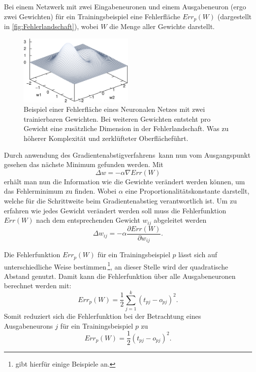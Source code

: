 Bei einem Netzwerk mit zwei Eingabeneuronen und einem Ausgabeneuron (ergo zwei Gewichten) für ein Trainingsbeispiel eine Fehlerfläche $Err_p(W)$ (dargestellt in \autoref{fig:Fehlerlandschaft}), wobei $W$ die Menge aller Gewichte darstellt.

\begin{figure}[tb]
    \centering
        \includegraphics[width=0.5\textwidth]{Bilder/misc/Fehlerlandschaft.png}
    \caption{Beispiel einer Fehlerfläche eines Neuronalen Netzes mit zwei trainierbaren Gewichten. Bei weiteren Gewichten entsteht pro Gewicht eine zusätzliche Dimension in der Fehlerlandschaft. Was zu höherer Komplexität und zerklüfteter \glqq Oberfläche\grqq führt.\protect\footnotemark{}}
    \label{fig:Fehlerlandschaft}
\end{figure}
\addtocounter{footnote}{-1}     %
\addtocounter{Hfootnote}{-1}    %
\wrapfigfoot{}

Durch anwendung des Gradientenabstigverfahrens\, kann nun vom Ausgangspunkt gesehen das nächste Minimum gefunden werden. Mit
\begin{equation}
\Delta w = - \alpha \nabla Err(W)
\end{equation}
erhält man nun die Information wie die Gewichte verändert werden können, um das Fehlerminimum zu finden.
Wobei $\alpha$ eine Proportionalitätskonstante darstellt, welche für die Schrittweite beim Gradientenabstieg verantwortlich ist.
Um zu erfahren wie jedes Gewicht verändert werden soll muss die Fehlerfunktion $Err(W)$ nach dem entsprechenden Gewicht $w_{ij}$ abgeleitet werden
\begin{equation}
\Delta w_{ij} = - \alpha \frac{\partial Err(W)}{\partial w_{ij}} .
\label{gl:gewaend}
\end{equation}

Die Fehlerfunktion $Err_p(W)$ für ein Trainingsbeispiel $p$ lässt sich auf unterschiedliche Weise bestimmen\,\footnote{\citet[60 f]{dkriesel07} gibt hierfür einige Beispiele an.}, an dieser Stelle wird der quadratische Abstand genutzt. Damit kann die Fehlerfunktion über alle Ausgabeneuronen berechnet werden mit:
\begin{equation}
Err_p(W)= \frac{1}{2} \sum^k_{j=1} (t_{pj}-o_{pj})^2 .
\end{equation}
Somit reduziert sich die Fehlerfunktion bei der Betrachtung eines Ausgabeneurons $j$ für ein Trainingsbeispiel $p$ zu
\begin{equation}
Err_p(W)= \frac{1}{2} (t_{pj}-o_{pj})^2 .
\label{gl:errp}
\end{equation}


